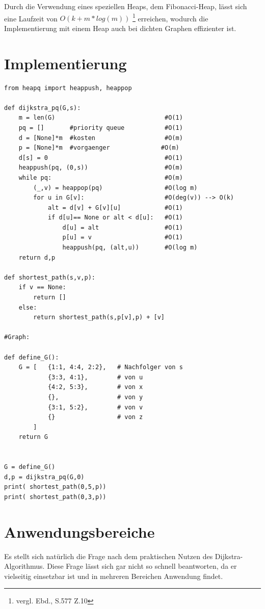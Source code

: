 \parindent0pt Durch die Verwendung eines speziellen Heaps, dem Fibonacci-Heap, lässt sich eine Laufzeit von $O(k + m * log(m))$ \footnote{vergl. Ebd., S.577 Z.10} erreichen, wodurch die Implementierung mit einem Heap auch bei dichten Graphen effizienter ist.


\section{Implementierung}

\lstset{language=Python}
\begin{lstlisting}
from heapq import heappush, heappop

def dijkstra_pq(G,s):
    m = len(G)                              #O(1)
    pq = []       #priority queue           #O(1)
    d = [None]*m  #kosten                   #O(m)
    p = [None]*m  #vorgaenger		       #O(m)
    d[s] = 0                                #O(1)
    heappush(pq, (0,s))                     #O(m)
    while pq:                               #O(m)
        (_,v) = heappop(pq)                 #O(log m)
        for u in G[v]:                      #O(deg(v)) --> O(k)  
            alt = d[v] + G[v][u]            #O(1)
            if d[u]== None or alt < d[u]:   #O(1)
                d[u] = alt		            #O(1)	
               	p[u] = v                    #O(1)
                heappush(pq, (alt,u))       #O(log m)        
    return d,p

def shortest_path(s,v,p):
	if v == None:
		return []
	else:
		return shortest_path(s,p[v],p) + [v]
 
#Graph: 
    
def define_G():
    G = [   {1:1, 4:4, 2:2},   # Nachfolger von s
            {3:3, 4:1},        # von u
            {4:2, 5:3},        # von x
            {},                # von y
            {3:1, 5:2},        # von v
            {}                 # von z
        ]
    return G


G = define_G()
d,p = dijkstra_pq(G,0)
print( shortest_path(0,5,p))
print( shortest_path(0,3,p))
\end{lstlisting}

\section{Anwendungsbereiche}
Es stellt sich natürlich die Frage nach dem praktischen Nutzen des Dijkstra-Algorithmus. Diese Frage lässt sich gar nicht so schnell beantworten, da er vielseitig einsetzbar ist und in mehreren Bereichen Anwendung findet.

